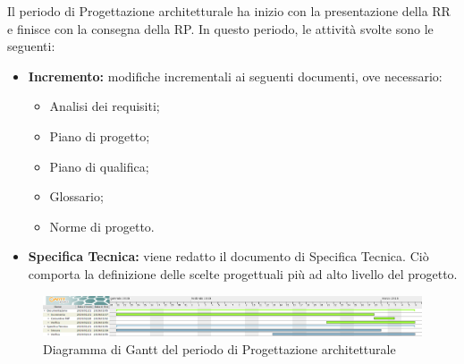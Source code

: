 Il periodo di Progettazione architetturale ha inizio con la presentazione della RR e finisce con la consegna della RP.\newline
In questo periodo, le attività svolte sono le seguenti:
\begin{itemize}
	\item \textbf{Incremento: }modifiche incrementali ai seguenti documenti, ove necessario:
	\begin{itemize}
		\item Analisi dei requisiti;
		\item Piano di progetto;
		\item Piano di qualifica;
		\item Glossario;
		\item Norme di progetto.
	\end{itemize}
	\item \textbf{Specifica Tecnica: }viene redatto il documento di Specifica Tecnica. Ciò comporta la definizione delle scelte progettuali più ad alto livello del progetto.
\end{itemize}

\begin{figure}[H]
	\includegraphics[width=1\linewidth]{Pianificazione/Progettazione_Architetturale_Gantt.png}
	\caption{Diagramma di Gantt del periodo di Progettazione architetturale}
\end{figure}
